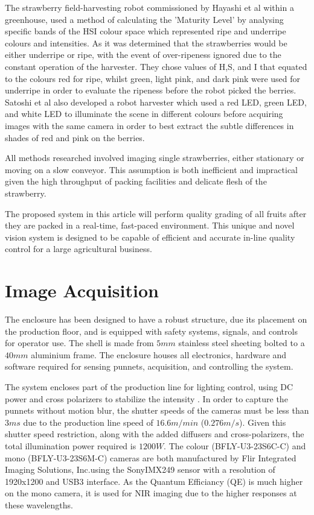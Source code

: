 \documentclass[fleqn,twoside,12pt]{report}
\begin{document}
The strawberry field-harvesting robot commissioned by Hayashi et al \cite{hayashi} within a greenhouse, used a method of calculating the 'Maturity Level' by analysing specific bands of the HSI colour space which represented ripe and underripe colours and intensities. As it was determined that the strawberries would be either underripe or ripe, with the event of over-ripeness ignored due to the constant operation of the harvester. They chose values of H,S, and I that equated to the colours red for ripe, whilst green, light pink, and dark pink were used for underripe in order to evaluate the ripeness before the robot picked the berries. Satoshi et al \cite{yamamoto2} also developed a robot harvester which used a red LED, green LED, and white LED to illuminate the scene in different colours before acquiring images with the same camera in order to best extract the subtle differences in shades of red and pink on the berries. 

All methods researched involved imaging single strawberries, either stationary or moving on a slow conveyor. This assumption is both inefficient and impractical given the high throughput of packing facilities and delicate flesh of the strawberry.

The proposed system in this article will perform quality grading of all fruits after they are packed in a real-time, fast-paced environment. This unique and novel vision system is designed to be capable of efficient and accurate in-line quality control for a large agricultural business.   



\section{Image Acquisition}

The enclosure has been designed to have a robust structure, due its placement on the production floor, and is equipped with safety systems, signals, and controls for operator use. The shell is made from $5mm$ stainless steel sheeting bolted to a $40mm$ aluminium frame. The enclosure houses all electronics, hardware and software required for sensing punnets, acquisition, and controlling the system.

The system encloses part of the production line for lighting control, using DC power and cross polarizers to stabilize the intensity \cite{eaton}. In order to capture the punnets without motion blur, the shutter speeds of the cameras must be less than $3ms$ due to the production line speed of $16.6m/min$ ($0.276m/s$). Given this shutter speed restriction, along with the added diffusers and cross-polarizers, the total illumination power required is $1200W$. The colour (BFLY-U3-23S6C-C) and mono (BFLY-U3-23S6M-C) cameras are both manufactured by Flir Integrated Imaging Solutions, Inc.\textregistered using the Sony\textregistered IMX249 sensor with a resolution of 1920x1200 and USB3 interface. As the Quantum Efficiancy (QE) is much higher on the mono camera, it is used for NIR imaging due to the higher responses at these wavelengths.
\end{document}
